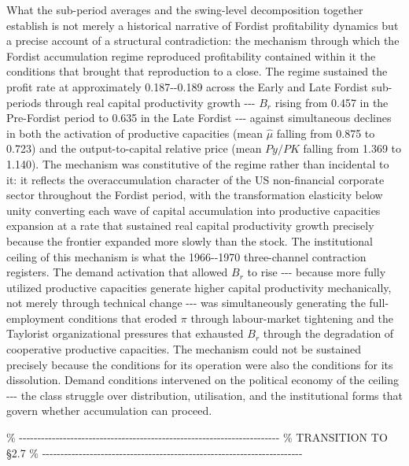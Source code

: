 What the sub-period averages and the swing-level decomposition together
establish is not merely a historical narrative of Fordist profitability
dynamics but a precise account of a structural contradiction: the
mechanism through which the Fordist accumulation regime reproduced
profitability contained within it the conditions that brought that
reproduction to a close. The regime sustained the profit rate at
approximately 0.187-\/-0.189 across the Early and Late Fordist
sub-periods through real capital productivity growth -\/-\/- \(B_{r}\)
rising from 0.457 in the Pre-Fordist period to 0.635 in the Late Fordist
-\/-\/- against simultaneous declines in both the activation of
productive capacities (mean \(\hat{\mu}\) falling from 0.875 to 0.723)
and the output-to-capital relative price (mean \(Py/PK\) falling from
1.369 to 1.140). The mechanism was constitutive of the regime rather
than incidental to it: it reflects the overaccumulation character of the
US non-financial corporate sector throughout the Fordist period, with
the transformation elasticity below unity converting each wave of
capital accumulation into productive capacities expansion at a rate that
sustained real capital productivity growth precisely because the
frontier expanded more slowly than the stock. The institutional ceiling
of this mechanism is what the 1966-\/-1970 three-channel contraction
registers. The demand activation that allowed \(B_{r}\) to rise -\/-\/-
because more fully utilized productive capacities generate higher
capital productivity mechanically, not merely through technical change
-\/-\/- was simultaneously generating the full-employment conditions
that eroded \(\pi\) through labour-market tightening and the Taylorist
organizational pressures that exhausted \(B_{r}\) through the
degradation of cooperative productive capacities. The mechanism could
not be sustained precisely because the conditions for its operation were
also the conditions for its dissolution. Demand conditions intervened on
the political economy of the ceiling -\/-\/- the class struggle over
distribution, utilisation, and the institutional forms that govern
whether accumulation can proceed.

\%
-\/-\/-\/-\/-\/-\/-\/-\/-\/-\/-\/-\/-\/-\/-\/-\/-\/-\/-\/-\/-\/-\/-\/-\/-\/-\/-\/-\/-\/-\/-\/-\/-\/-\/-\/-\/-\/-\/-\/-\/-\/-\/-\/-\/-\/-\/-\/-\/-\/-\/-\/-\/-\/-\/-\/-\/-\/-\/-\/-\/-\/-\/-\/-\/-\/-\/-\/-\/-\/-\/-
\% TRANSITION TO §2.7 \%
-\/-\/-\/-\/-\/-\/-\/-\/-\/-\/-\/-\/-\/-\/-\/-\/-\/-\/-\/-\/-\/-\/-\/-\/-\/-\/-\/-\/-\/-\/-\/-\/-\/-\/-\/-\/-\/-\/-\/-\/-\/-\/-\/-\/-\/-\/-\/-\/-\/-\/-\/-\/-\/-\/-\/-\/-\/-\/-\/-\/-\/-\/-\/-\/-\/-\/-\/-\/-\/-\/-

